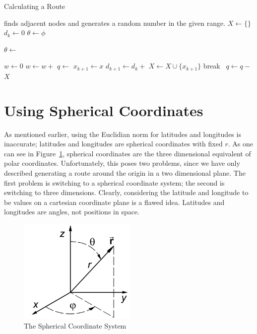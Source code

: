 \documentclass[twocolumn,12pt]{article}
\begin{document}
\begin{algorithm}[t!]
  \caption{Calculating a Route} \label{alg:grow}
  \begin{algorithmic}
    \Require {} finds adjacent nodes and  generates
    a random number in the given range.
    \State $X \gets \{\}$ 
    \State $d_k \gets 0$
    \State $\theta \gets \phi$

      \State $\theta \gets$ 

      \State $w \gets 0$ 
        \State $w \gets w +$
      \EndFor
      \State $q \gets$ 
          \State $x_{k+1} \gets x$
          \State $d_{k+1} \gets d_k +$
          \State $X \gets X \cup \{x_{k+1}\}$
          \State break
        \Else~$q \gets q -$
        \EndIf
      \EndFor
    \EndWhile
    \State \Return $X$
  \EndFunction

  \end{algorithmic}
\end{algorithm}

\section{Using Spherical Coordinates} \label{sec:latlong}

As mentioned earlier, using the Euclidian norm for latitudes and longitudes
is inaccurate; latitudes and longitudes are spherical coordinates  with
fixed $r$. As one can see in Figure~\ref{fig:sphere},
spherical coordinates are the three dimensional
equivalent of polar coordinates. Unfortunately, this poses two problems,
since we have only described generating a route around the origin in a two
dimensional plane. The first problem is switching to a spherical coordinate
system; the second is switching to three dimensions. Clearly,
considering the latitude and longitude to be values on a cartesian
coordinate plane is a flawed idea. Latitudes and longitudes are angles, not
positions in space.

\begin{figure}
  \centering
  \includegraphics[height=2in]{images/sphere.png}
  \caption{The Spherical Coordinate System~} \label{fig:sphere}
\end{figure}
\end{document}
